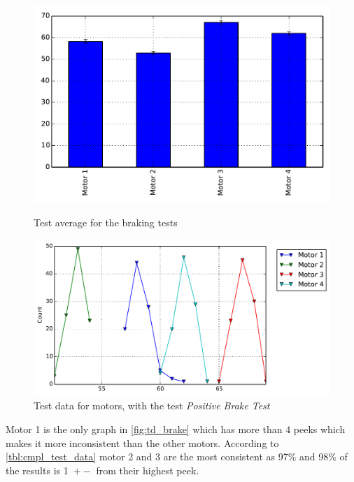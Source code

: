 \begin{figure}[!htb]
    \centering
    \begin{minipage}{.5\textwidth}
        \centering
        \includegraphics[width=1\textwidth]{graphics/test_graphs/Break_barplot.pdf}
        \caption{Test average for the braking tests}
        \label{fig:td_brake}
    \end{minipage}%
    \begin{minipage}{0.5\textwidth}
        \centering
		\includegraphics[width=1\textwidth]{graphics/test_graphs/Break_lineplot.pdf}
     	\caption{Test data for motors, with the test \emph{Positive Brake Test}}
		\label{fig:cmp_all}
    \end{minipage}
\end{figure}

Motor 1 is the only graph in  \cref{fig:td_brake} which has more than 4 peeks which makes it more inconsistent than the other motors. According to \cref{tbl:cmpl_test_data} motor 2 and 3 are the most consistent as 97\% and 98\% of the results is 1\degree\ $+-$ from their highest peek.

